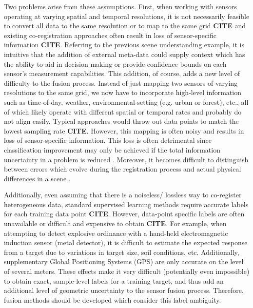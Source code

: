 Two problems arise from these assumptions.  First, when working with sensors operating at varying spatial and temporal resolutions, it is not necessarily feasible to convert all data to the same resolution or to map to the same grid \textbf{CITE} and existing co-registration approaches often result in loss of sensor-specific information \textbf{CITE}.  Referring to the previous scene understanding example, it is intuitive that the addition of external meta-data could supply context which has the ability to aid in decision making or provide confidence bounds on each sensor's measurement capabilities.  This addition, of course, adds a new level of difficulty to the fusion process.  Instead of just mapping two sensors of varying resolutions to the same grid, we now have to incorporate high-level information such as time-of-day, weather, environmental-setting (e.g. urban or forest), etc., all of which likely operate with different spatial or temporal rates and probably do not align easily.  Typical approaches would throw out data points to match the lowest sampling rate \textbf{CITE}.  However, this mapping is often noisy and results in loss of sensor-specific information.  This loss is often detrimental since classification improvement may only be achieved if the total information uncertainty in a problem is reduced \cite{Ruta2000OverviewClassifierFusionMethods}.  Moreover, it becomes difficult to distinguish between errors which evolve during the registration process and actual physical differences in a scene \cite{Zitova2003SurveyImageRegistrationMethods}.
\newline 

Additionally, even assuming that there is a noiseless/ lossless way to co-register heterogeneous data, standard supervised learning methods require accurate labels for each training data point \textbf{CITE}.  However, data-point specific labels are often unavailable or difficult and expensive to obtain \textbf{CITE}.  For example, when attempting to detect explosive ordinance with a hand-held electromagnetic induction sensor (metal detector), it is difficult to estimate the expected response from a target due to variations in target size, soil conditions, etc.   Additionally, supplementary Global Positioning Systems (GPS) are only accurate on the level of several meters. These effects make it very difficult (potentially even impossible) to obtain exact, sample-level labels for a training target, and thus add an additional level of geometric uncertainty to the sensor fusion process.  Therefore, fusion methods should be developed which consider this label ambiguity.
\newline

